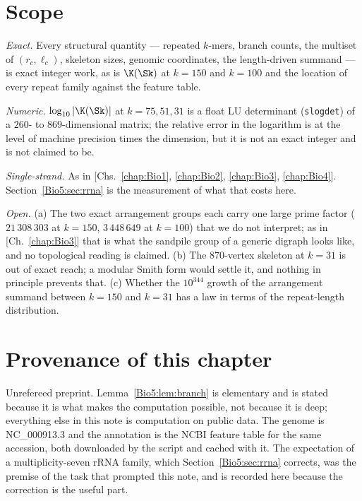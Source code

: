\section{Scope}\label{Bio5:sec:scope}

\emph{Exact.} Every structural quantity --- repeated $k$-mers, branch counts, the multiset
of $(r_c,\ell_c)$, skeleton sizes, genomic coordinates, the length-driven summand --- is
exact integer work, as is $\K(\Sk)$ at $k=150$ and $k=100$ and the location of every repeat
family against the feature table.

\emph{Numeric.} $\log_{10}|\K(\Sk)|$ at $k=75,51,31$ is a float LU determinant
(\texttt{slogdet}) of a $260$- to $869$-dimensional matrix; the relative error in the
logarithm is at the level of machine precision times the dimension, but it is not an
exact integer and is not claimed to be.

\emph{Single-strand.} As in [Chs.~\ref{chap:Bio1}, \ref{chap:Bio2}, \ref{chap:Bio3}, \ref{chap:Bio4}]. Section~\ref{Bio5:sec:rrna} is the
measurement of what that costs here.

\emph{Open.} (a) The two exact arrangement groups each carry one large prime factor
($21\,308\,303$ at $k=150$, $3\,448\,649$ at $k=100$) that we do not interpret; as in
[Ch.~\ref{chap:Bio3}] that is what the sandpile group of a generic digraph looks like, and no
topological reading is claimed. (b) The $870$-vertex skeleton at $k=31$ is out of exact
reach; a modular Smith form would settle it, and nothing in principle prevents that.
(c) Whether the $10^{344}$ growth of the arrangement summand between $k=150$ and $k=31$
has a law in terms of the repeat-length distribution.

\section*{Provenance of this chapter}

Unrefereed preprint. Lemma~\ref{Bio5:lem:branch} is elementary and is stated because it is
what makes the computation possible, not because it is deep; everything else in this note
is computation on public data. The genome is NC\_000913.3 and the annotation is the NCBI
feature table for the same accession, both downloaded by the script and cached with it.
The expectation of a multiplicity-seven rRNA family, which Section~\ref{Bio5:sec:rrna}
corrects, was the premise of the task that prompted this note, and is recorded here
because the correction is the useful part.

